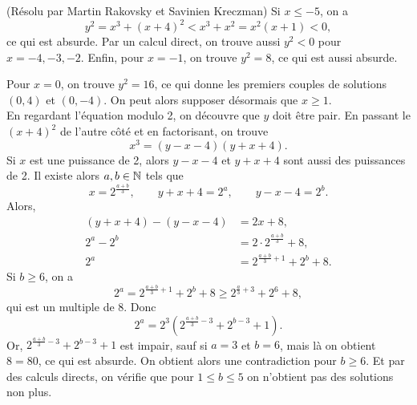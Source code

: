 \begin{sol}[116](R\'esolu par Martin Rakovsky et Savinien Kreczman)
Si $x\leq-5$, on a
\[y^2=x^3+(x+4)^2<x^3+x^2=x^2(x+1)<0,\]
ce qui est absurde. Par un calcul direct, on trouve aussi $y^2<0$ pour $x=-4,-3,-2$. Enfin, pour $x=-1$, on trouve $y^2=8$, ce qui est aussi absurde.

Pour $x=0$, on trouve $y^2=16$, ce qui donne les premiers couples de solutions $(0,4)$ et $(0,-4)$. On peut alors supposer d\'esormais que $x\geq 1$.\\

En regardant l'\'equation modulo 2, on d\'ecouvre que $y$ doit \^etre pair. En passant le $(x+4)^2$ de l'autre c\^ot\'e et en factorisant, on trouve
\begin{equation*}\label{eq1}
x^3=(y-x-4)(y+x+4).\tag{1}
\end{equation*}
Si $x$ est une puissance de 2, alors $y-x-4$ et $y+x+4$ sont aussi des puissances de 2. Il existe alors $a,b\in\mathbb{N}$ tels que
\[x=2^{\frac{a+b}{3}},\qquad y+x+4=2^a,\qquad y-x-4=2^b.\]
Alors,
\begin{align*}
(y+x+4)-(y-x-4) &=2x+8,\\
2^a-2^b&=2\cdot 2^{\frac{a+b}{3}}+8,\\
2^a&=2^{\frac{a+b}{3}+1}+2^b+8.
\end{align*}
Si $b\geq 6$, on a
\[2^a=2^{\frac{a+b}{3}+1}+2^b+8\geq 2^{\frac{a}{3}+3}+2^6+8,\]
qui est un multiple de 8. Donc
\[2^a=2^3(2^{\frac{a+b}{3}-3}+2^{b-3}+1).\]
Or, $2^{\frac{a+b}{3}-3}+2^{b-3}+1$ est impair, sauf si $a=3$ et $b=6$, mais l\`a on obtient $8=80$, ce qui est absurde. On obtient alors une contradiction pour $b\geq 6$. Et par des calculs directs, on v\'erifie que pour $1\leq b\leq 5$ on n'obtient pas des solutions non plus.\\


\end{sol}
